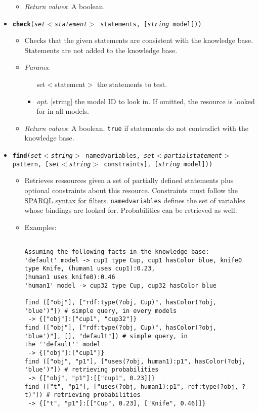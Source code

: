 \begin{itemize}
\begin{itemize}
\item  \emph{Return values}: A boolean.
\end{itemize}

\item  \texttt{\textbf{check}(\emph{set$<$statement$>$} statements, [\emph{string} model]))}
\begin{itemize}
\item  Checks that the given statements are consistent with the knowledge base. Statements are not added to the knowledge base.
\item  \emph{Params}:
\begin{itemize}
\item  [set$<$statement$>$] the statements to test.
\item  \emph{opt.} [string] the model ID to look in. If omitted, the resource is looked for in all models. 
\end{itemize}

\item  \emph{Return values}: A boolean. \texttt{true} if statements do not contradict with the knowledge base.
\end{itemize}

\item  \texttt{\textbf{find}(\emph{set$<$string$>$} named{\textunderscore}variables, \emph{set$<$partial{\textunderscore}statement$>$} pattern, [\emph{set$<$string$>$} constraints], [\emph{string} model]))}
\begin{itemize}
\item  Retrieves ressources given a set of partially defined statements plus optional constraints about this resource. Constraints must follow the \href{http://www.w3.org/TR/rdf-sparql-query/\#tests}{ SPARQL syntax for filters}. \texttt{named{\textunderscore}variables} defines the set of variables whose bindings are looked for. Probabilities can be retrieved as well.
\item  Examples: 
\small
\begin{verbatim}

Assuming the following facts in the knowledge base:
'default' model -> cup1 type Cup, cup1 hasColor blue, knife0 type Knife, (human1 uses cup1):0.23,
(human1 uses knife0):0.46
'human1' model -> cup32 type Cup, cup32 hasColor blue

find (["obj"], ["rdf:type(?obj, Cup)", hasColor(?obj, 'blue')"]) # simple query, in every models
 -> {["obj"]:["cup1", "cup32"]}
find (["obj"], ["rdf:type(?obj, Cup)", hasColor(?obj, 'blue')"], [], "default"]) # simple query, in
the ''default'' model
 -> {["obj"]:["cup1"]}
find (["obj", "p1"], ["uses(?obj, human1):p1", hasColor(?obj, 'blue')"]) # retrieving probabilities
 -> {["obj", "p1"]:[["cup1", 0.23]]}
find (["t", "p1"], ["uses(?obj, human1):p1", rdf:type(?obj, ?t)"]) # retrieving probabilities
 -> {["t", "p1"]:[["Cup", 0.23], ["Knife", 0.46]]}


\end{verbatim}
\end{itemize}
\end{itemize}
